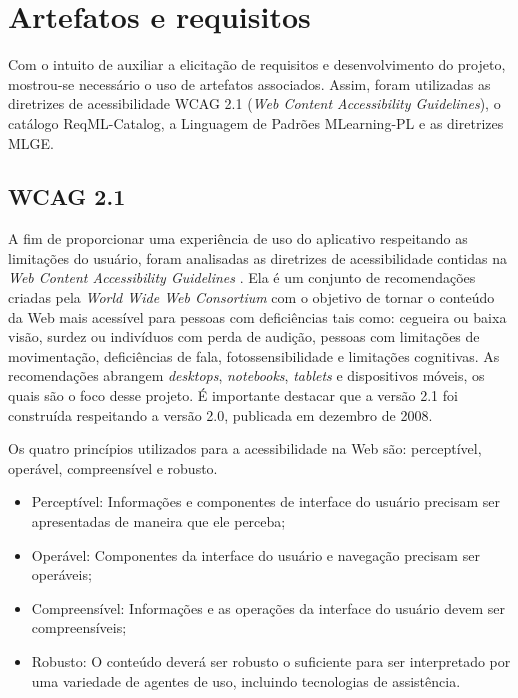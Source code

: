 \section{Artefatos e requisitos}
\label{subsec:artefatos}
Com o intuito de auxiliar a elicitação de requisitos e desenvolvimento do projeto, mostrou-se necessário o uso de artefatos associados.
Assim, foram utilizadas as diretrizes de acessibilidade WCAG 2.1 (\textit{Web Content Accessibility Guidelines}), o catálogo ReqML-Catalog, a Linguagem de Padrões MLearning-PL e as diretrizes MLGE.

\subsection{WCAG 2.1}
A fim de proporcionar uma experiência de uso do aplicativo respeitando as limitações do usuário, foram analisadas as diretrizes de acessibilidade contidas na \textit{Web Content Accessibility Guidelines} \citep{wcag}. Ela é um conjunto de recomendações criadas pela
\textit{World Wide Web Consortium} \citep{w3c} com o objetivo de tornar o conteúdo da Web mais acessível para pessoas com deficiências tais como: cegueira ou baixa visão, surdez ou indivíduos com perda de audição, pessoas com limitações de movimentação, deficiências de fala, fotossensibilidade e limitações cognitivas. As recomendações abrangem \textit{desktops}, \textit{notebooks}, \textit{tablets} e dispositivos móveis, os quais são o foco desse projeto. É importante destacar que a versão 2.1 foi construída respeitando a versão 2.0, publicada em dezembro de 2008. %

Os quatro princípios utilizados para a acessibilidade na Web são: perceptível, operável, compreensível e robusto.
\begin{itemize}
    \item Perceptível: Informações e componentes de interface do usuário precisam ser apresentadas de maneira que ele perceba;
    \item Operável: Componentes da interface do usuário e navegação precisam ser operáveis;
    \item Compreensível: Informações e as operações da interface do usuário devem ser compreensíveis;
    \item Robusto: O conteúdo deverá ser robusto o suficiente para ser interpretado por uma variedade de agentes de uso, incluindo tecnologias de assistência.
\end{itemize}

